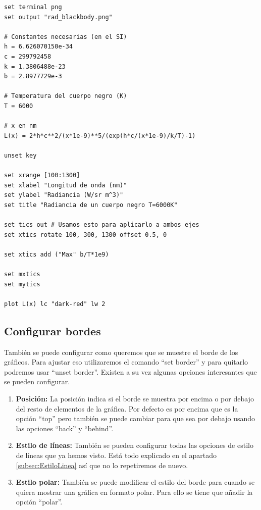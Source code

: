 \documentclass[11pt,a4paper,twoside,pdf]{article}
\numberwithin{equation}{section}
\begin{document}
\begin{lstlisting}[language=Gnuplot]
set terminal png
set output "rad_blackbody.png"

# Constantes necesarias (en el SI)
h = 6.626070150e-34
c = 299792458
k = 1.3806488e-23
b = 2.8977729e-3

# Temperatura del cuerpo negro (K)
T = 6000

# x en nm
L(x) = 2*h*c**2/(x*1e-9)**5/(exp(h*c/(x*1e-9)/k/T)-1)

unset key

set xrange [100:1300]
set xlabel "Longitud de onda (nm)"
set ylabel "Radiancia (W/sr m^3)"
set title "Radiancia de un cuerpo negro T=6000K"

set tics out # Usamos esto para aplicarlo a ambos ejes
set xtics rotate 100, 300, 1300 offset 0.5, 0

set xtics add ("Max" b/T*1e9)

set mxtics
set mytics

plot L(x) lc "dark-red" lw 2
\end{lstlisting}

\subsection{Configurar bordes}

También se puede configurar como queremos que se muestre el borde de los gráficos. Para ajustar eso utilizaremos el comando ``set border'' y para quitarlo podremos usar ``unset border''. Existen a su vez algunas opciones interesantes que se pueden configurar.

\begin{enumerate}
    \item \textbf{Posición:} La posición indica si el borde se muestra por encima o por debajo del resto de elementos de la gráfica. Por defecto es por encima que es la opción ``top'' pero también se puede cambiar para que sea por debajo usando las opciones ``back'' y ``behind''.
    \item \textbf{Estilo de líneas:} También se pueden configurar todas las opciones de estilo de líneas que ya hemos visto. Está todo explicado en el apartado \ref{subsec:EstiloLinea} así que no lo repetiremos de nuevo.
    \item \textbf{Estilo polar:} También se puede modificar el estilo del borde para cuando se quiera mostrar una gráfica en formato polar. Para ello se tiene que añadir la opción ``polar''.
\end{enumerate}
\end{document}
